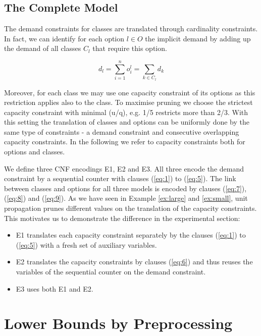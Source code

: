 \documentclass[]{easychair}
\begin{document}
\subsection{The Complete Model}
\label{sub:complete}


The demand constraints for classes are translated through cardinality constraints.  In fact, we can identify for each
option $l \in O$ the implicit demand by adding up the demand of all classes $C_l$ that require this option.

$$ d_l = \sum_{i=1}^n o^l_i = \sum_{k\in C_l} d_k$$                                                 

Moreover, for each class we may use one capacity constraint of its options as this restriction applies also to the
class. To maximise pruning we choose the strictest capacity constraint with minimal (u/q), e.g. 1/5 restricts more than
2/3. With this setting the translation of classes and options can be uniformly done by the same type of constraints - a
demand constraint and consecutive overlapping capacity constraints. In the following we refer to capacity constraints
both for options and classes. 
 
We define three CNF encodings E1, E2 and E3. All three encode the demand constraint by a sequential counter with clauses
(\ref{eq:1}) to (\ref{eq:5}).  The link between classes and options for all three models is encoded by clauses
(\ref{eq:7}),(\ref{eq:8}) and (\ref{eq:9}). As we have seen in Example \ref{ex:large} and \ref{ex:small}, unit
propagation prunes different values on the translation of the capacity constraints. This motivates us to demonstrate the
difference in the experimental section: 

\begin{itemize}
    \item E1 translates each capacity constraint separately by the clauses (\ref{eq:1}) to (\ref{eq:5}) with a fresh set
        of auxiliary variables. 
    \item E2 translates the capacity constraints by clauses (\ref{eq:6}) and thus reuses the variables of the
        sequential counter on the demand constraint. 
    \item E3 uses both E1 and E2. 
\end{itemize}


\section{Lower Bounds by Preprocessing}
\label{sec:lower}
\end{document}
